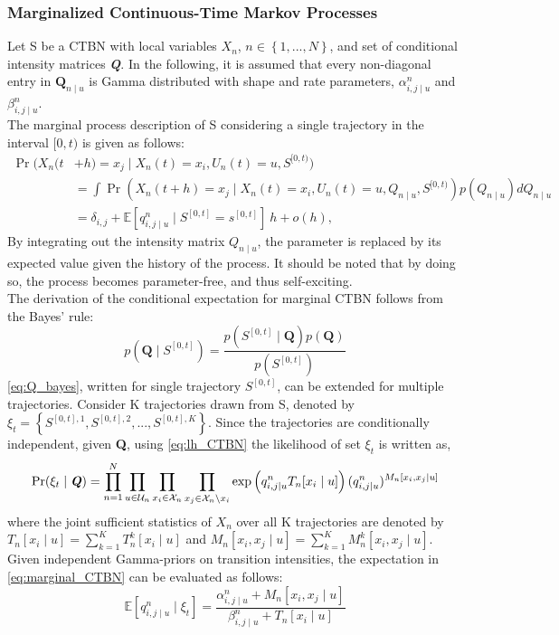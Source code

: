 \subsubsection{Marginalized Continuous-Time Markov Processes}
Let S be a CTBN with local variables $ X_n $, $ n\in \left\lbrace 1,...,N \right\rbrace $, and set of conditional intensity matrices \textbf{\textit{Q}}. In the following, it is assumed that every non-diagonal entry in $ \textbf{Q}_{n\mid u} $ is Gamma distributed with shape and rate parameters, $ \alpha^n_{i,j\mid u} $ and $ \beta^n_{i,j\mid u} $.\\
The marginal process description of S considering a single trajectory in the interval $ [0,t) $ is given as follows:
\begin{align}
\operatorname{Pr}(X_n(t &+ h) = x_j \mid X_n(t)=x_i, U_n(t)=u, S^{[0, t)})\\
&= \int \operatorname{Pr}(X_n(t + h) = x_j \mid X_n(t)=x_i, U_n(t)=u, Q_{n\mid u}, S^{[0, t)})p(Q_{n\mid u})dQ_{n\mid u}\\
&= \delta_{i,j} + \mathbb{E}[q^n_{i,j\mid u} \mid S^{[0, t]} = s^{[0, t]}]\ h + o(h),
\label{eq:marginal_CTBN}
\end{align}
By integrating out the intensity matrix $ Q_{n\mid u} $, the parameter is replaced by its expected value given the history of the process. It should be noted that by doing so, the process becomes parameter-free, and thus self-exciting. \\
The derivation of the conditional expectation for marginal CTBN follows from the Bayes' rule:
\begin{equation}
p\left(\textbf{Q} \mid S^{[0,t]}\right)=\frac{p\left(S^{[0,t]} \mid \textbf{Q}\right) p(\textbf{Q})}{p\left(S^{[0,t]}\right)}
\label{eq:Q_bayes}
\end{equation}
\autoref{eq:Q_bayes}, written for single trajectory $ S^{[0,t]} $, can be extended for multiple trajectories. Consider K trajectories drawn from S, denoted by $ \xi_t = \left\lbrace S^{[0,t], 1}, S^{[0,t], 2}, ..., S^{[0,t], K} \right\rbrace  $. Since the trajectories are conditionally independent, given \textbf{Q}, using \autoref{eq:lh_CTBN} the likelihood of set $ \xi_t $ is written as,
\begin{align}
\operatorname{Pr}( \xi_t  \mid \textbf{\textit{Q}} ) = \prod_{n=1}^{N} \prod_{u \in \mathcal{U}_{n}} \prod_{x_i \in \mathcal{X}_{n}} \prod_{x_j \in \mathcal{X}_{n} \backslash x_i}
\exp \left( q_{i,j\mid u}^{n} T_{n}[x_i\mid u]\right) (q_{i,j\mid u}^{n})^{M_{n}[x_i, x_j\mid u]}
\label{eq:lh_dataset_CTBN}
\end{align}
where the joint sufficient statistics of $ X_n $ over all K trajectories are denoted by  $ T_{n}[x_i\mid u] = \sum_{k=1}^{K} T_{n}^k[x_i\mid u] $ and $ M_{n}[x_i, x_j\mid u] =\sum_{k=1}^{K} M_{n}^k[x_i, x_j\mid u]$.\\
Given independent Gamma-priors on transition intensities, the expectation in \autoref{eq:marginal_CTBN} can be evaluated as follows:
\begin{equation}
\mathbb{E}\left[q_{i,j\mid u}^{n} \mid \xi_{t}\right]=\frac{\alpha^n_{i,j\mid u}+M_{n}[x_i, x_j\mid u]}{\beta^n_{i,j\mid u}+T_{n}[x_i \mid u]}
\label{eq:estimated_Q}
\end{equation}

